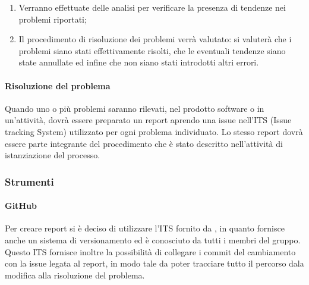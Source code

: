 \begin{enumerate}
				\item Verranno effettuate delle analisi per verificare la presenza di tendenze nei problemi riportati;

				\item Il procedimento di risoluzione dei problemi verrà valutato: si valuterà che i problemi siano stati effettivamente risolti, che le eventuali tendenze siano state annullate ed infine che non siano stati introdotti altri errori.
			\end{enumerate}
		\paragraph{Risoluzione del problema}
			Quando uno o più problemi saranno rilevati, nel prodotto software o in un'attività, dovrà essere preparato un report aprendo una issue nell'ITS (Issue tracking System) utilizzato per ogni problema individuato. Lo stesso report dovrà essere parte integrante del procedimento che è stato descritto nell'attività di istanziazione del processo.
	\subsubsection{Strumenti}
		\paragraph{GitHub}
			Per creare report si è deciso di utilizzare l'ITS fornito da , in quanto fornisce anche un sistema di versionamento ed è conosciuto da tutti i membri del gruppo.
			Questo ITS fornisce inoltre la possibilità di collegare i commit del cambiamento con la issue legata al report, in modo tale da poter tracciare tutto il percorso dala modifica alla risoluzione del problema.
